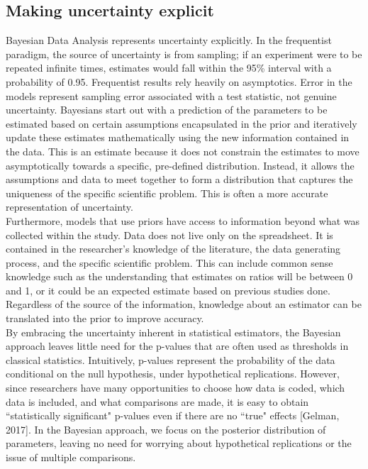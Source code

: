 \documentclass{article}
\begin{document}
\subsection{Making uncertainty explicit}
Bayesian Data Analysis represents uncertainty explicitly. In the frequentist paradigm, the source of uncertainty is from sampling; if an experiment were to be repeated infinite times, estimates would fall within the 95\% interval with a probability of 0.95. Frequentist results rely heavily on asymptotics. Error in the models represent sampling error associated with a test statistic, not genuine uncertainty. Bayesians start out with a prediction of the parameters to be estimated based on certain assumptions encapsulated in the prior and iteratively update these estimates mathematically using the new information contained in the data. This is an estimate because it does not constrain the estimates to move asymptotically towards a specific, pre-defined distribution. Instead, it allows the assumptions and data to meet together to form a distribution that captures the uniqueness of the specific scientific problem. This is often a more accurate representation of uncertainty.\\
Furthermore, models that use priors have access to information beyond what was collected within the study. Data does not live only on the spreadsheet. It is contained in the researcher's knowledge of the literature, the data generating process, and the specific scientific problem. This can include common sense knowledge such as the understanding that estimates on ratios will be between 0 and 1, or it could be an expected estimate based on previous studies done. Regardless of the source of the information, knowledge about an estimator can be translated into the prior to improve accuracy. \\ 
By embracing the uncertainty inherent in statistical estimators, the Bayesian approach leaves little need for the p-values that are often used as thresholds in classical statistics.  Intuitively, p-values represent the probability of the data conditional on the null hypothesis, under hypothetical replications.  However, since researchers have many opportunities to choose how data is coded, which data is included, and what comparisons are made, it is easy to obtain ``statistically significant" p-values even if there are no ``true" effects [Gelman, 2017].  In the Bayesian approach, we focus on the posterior distribution of parameters, leaving no need for worrying about hypothetical replications or the issue of multiple comparisons.
\end{document}
